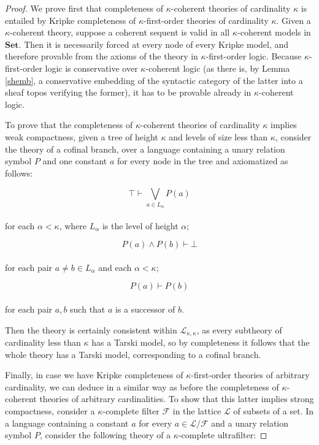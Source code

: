 \documentclass[a4paper,11pt]{article}
\theoremstyle{plain}
\theoremstyle{plain}
\theoremstyle{remark}
\newcommand{\Sets}{\ensuremath{\mathbf{Set}}}
\begin{document}
\begin{proof}
We prove first that completeness of $\kappa$-coherent theories of cardinality $\kappa$ is entailed by Kripke completeness of $\kappa$-first-order theories of cardinality $\kappa$. Given a $\kappa$-coherent theory, suppose a coherent sequent is valid in all $\kappa$-coherent models in \Sets. Then it is necessarily forced at every node of every Kripke model, and therefore provable from the axioms of the theory in $\kappa$-first-order logic. Because $\kappa$-first-order logic is conservative over $\kappa$-coherent logic (as there is, by Lemma \ref{shemb}, a conservative embedding of the syntactic category of the latter into a sheaf topos verifying the former), it has to be provable already in $\kappa$-coherent logic.

To prove that the completeness of $\kappa$-coherent theories of cardinality $\kappa$ implies weak compactness, given a tree of height $\kappa$ and levels of size less than $\kappa$, consider the theory of a cofinal branch, over a language containing a unary relation symbol $P$ and one constant $a$ for every node in the tree and axiomatized as follows:
 
 $$\top \vdash \bigvee_{a \in L_{\alpha}}P(a)$$
 \\
 for each $\alpha<\kappa$, where $L_{\alpha}$ is the level of height $\alpha$;
 
 $$P(a) \wedge P(b) \vdash \bot$$
 \\
 for each pair $a \neq b \in L_{\alpha}$ and each $\alpha<\kappa$;
 
 $$P(a) \vdash P(b)$$
 \\
 for each pair $a, b$ such that $a$ is a successor of $b$.
 
 
Then the theory is certainly consistent within $\mathcal{L}_{\kappa, \kappa}$, as every subtheory of cardinality less than $\kappa$ has a Tarski model, so by completeness it follows that the whole theory has a Tarski model, corresponding to a cofinal branch.
 
Finally, in case we have Kripke completeness of $\kappa$-first-order theories of arbitrary cardinality, we can deduce in a similar way as before the completeness of $\kappa$-coherent theories of arbitrary cardinalities. To show that this latter implies strong compactness, consider a $\kappa$-complete filter $\mathcal{F}$ in the lattice $\mathcal{L}$ of subsets of a set. In a language containing a constant $a$ for every $a \in \mathcal{L}/\mathcal{F}$ and a unary relation symbol $P$, consider the following theory of a $\kappa$-complete ultrafilter:
 

\end{proof}
\end{document}
